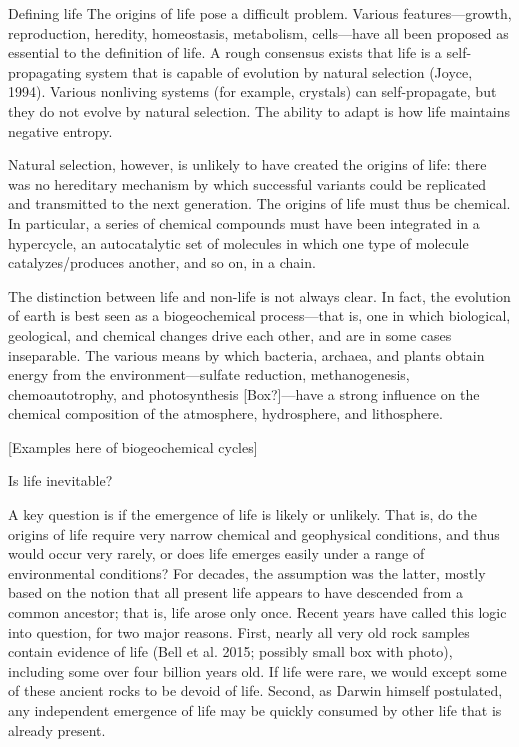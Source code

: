 \documentclass{tufte-book} %
\begin{document}
Defining life
The origins of life pose a difficult problem. Various features—growth, reproduction, heredity, homeostasis, metabolism, cells—have all been proposed as essential to the definition of life. A rough consensus exists that life is a self-propagating system that is capable of evolution by natural selection (Joyce, 1994). Various nonliving systems (for example, crystals) can self-propagate, but they do not evolve by natural selection. The ability to adapt is how life maintains negative entropy. 

Natural selection, however, is unlikely to have created the origins of life: there was no hereditary mechanism by which successful variants could be replicated and transmitted to the next generation. The origins of life must thus be chemical. In particular, a series of chemical compounds must have been integrated in a hypercycle, an autocatalytic set of molecules in which one type of molecule catalyzes/produces another, and so on, in a chain. 

The distinction between life and non-life is not always clear. In fact, the evolution of earth is best seen as a biogeochemical process—that is, one in which biological, geological, and chemical changes drive each other, and are in some cases inseparable. The various means by which bacteria, archaea, and plants obtain energy from the environment—sulfate reduction, methanogenesis, chemoautotrophy, and photosynthesis [Box?]—have a strong influence on the chemical composition of the atmosphere, hydrosphere, and lithosphere. 

[Examples here of biogeochemical cycles]

Is life inevitable?

A key question is if the emergence of life is likely or unlikely. That is, do the origins of life require very narrow chemical and geophysical conditions, and thus would occur very rarely, or does life emerges easily under a range of environmental conditions? For decades, the assumption was the latter, mostly based on the notion that all present life appears to have descended from a common ancestor; that is, life arose only once. Recent years have called this logic into question, for two major reasons. First, nearly all very old rock samples contain evidence of life (Bell et al. 2015; possibly small box with photo), including some over four billion years old. If life were rare, we would except some of these ancient rocks to be devoid of life. Second, as Darwin himself postulated, any independent emergence of life may be quickly consumed by other life that is already present. 
\end{document}
